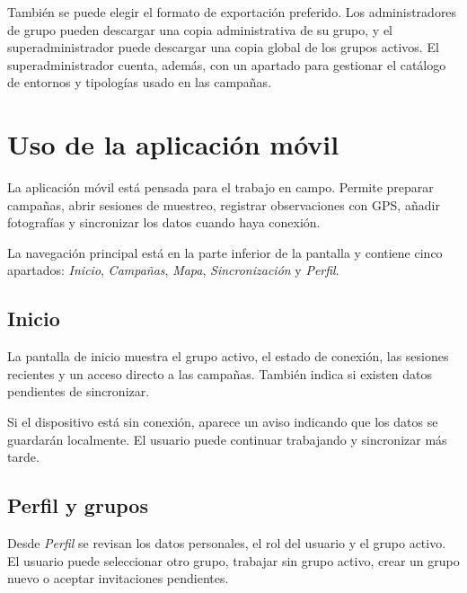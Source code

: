También se puede elegir el formato de exportación preferido. Los administradores de
grupo pueden descargar una copia administrativa de su grupo, y el superadministrador
puede descargar una copia global de los grupos activos. El superadministrador cuenta,
además, con un apartado para gestionar el catálogo de entornos y tipologías usado en
las campañas.

\section{Uso de la aplicación móvil}

La aplicación móvil está pensada para el trabajo en campo. Permite preparar campañas,
abrir sesiones de muestreo, registrar observaciones con GPS, añadir fotografías y
sincronizar los datos cuando haya conexión.

La navegación principal está en la parte inferior de la pantalla y contiene cinco
apartados: \textit{Inicio}, \textit{Campañas}, \textit{Mapa}, \textit{Sincronización}
y \textit{Perfil}.


\subsection{Inicio}

La pantalla de inicio muestra el grupo activo, el estado de conexión, las sesiones
recientes y un acceso directo a las campañas. También indica si existen datos
pendientes de sincronizar.


Si el dispositivo está sin conexión, aparece un aviso indicando que los datos se
guardarán localmente. El usuario puede continuar trabajando y sincronizar más tarde.

\subsection{Perfil y grupos}

Desde \textit{Perfil} se revisan los datos personales, el rol del usuario y el grupo
activo. El usuario puede seleccionar otro grupo, trabajar sin grupo activo, crear un
grupo nuevo o aceptar invitaciones pendientes.


